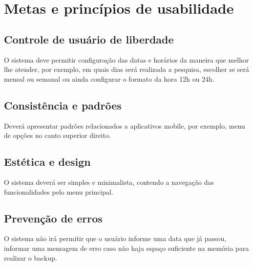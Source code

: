 \chapter[Metas e princípios de usabilidade]{Metas e princípios de usabilidade}

\section{Controle de usuário de liberdade}

\item O sistema deve permitir configuração das datas e horários da maneira que melhor lhe atender, por exemplo, em quais dias será realizada a pesquisa, escolher se será mensal ou semanal ou ainda configurar o formato da hora 12h ou 24h.

\section{Consistência e padrões}

\item Deverá apresentar padrões relacionados a aplicativos mobile, por exemplo, menu de opções no canto superior direito.

\section{Estética e design}

\item O sistema deverá ser simples e minimalista, contendo a navegação das funcionalidades pelo menu principal.

\section{Prevenção de erros}

\item O sistema não irá permitir que o usuário informe uma data que já passou, informar uma mensagem de erro caso não haja espaço suficiente na memória para realizar o backup.